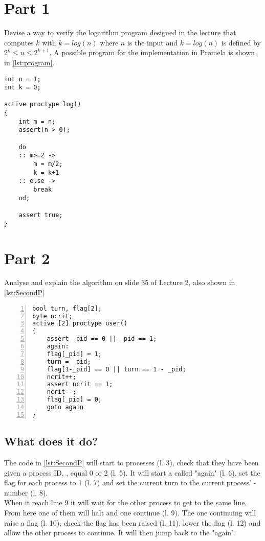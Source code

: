 \documentclass[Main]{subfiles}
\begin{document}
\section*{Part 1}

Devise a way to verify the logarithm program designed in the lecture that computes $k$ with $k = log(n)$ where $n$ is the input and $k = log(n)$ is defined by $2^k \leq n \leq 2^{k+1}$. 
A possible program for the implementation in Promela is shown in \codeTitle \ref{lst:program}.


\begin{lstlisting}[caption=Program in Prolog, style=Code-Matlab, label=lst:program]
int n = 1; 
int k = 0; 

active proctype log() 
{ 
	int m = n; 
	assert(n > 0);

	do
	:: m>=2 -> 
		m = m/2; 
		k = k+1
	:: else -> 
		break
	od;
	
	assert true;
}
\end{lstlisting}


\section*{Part 2}
Analyse and explain the algorithm on slide 35 of Lecture 2, also shown in \codeTitle \ref{lst:SecondP}


\begin{lstlisting}[caption=Program to explain, style=Code-Prolog, numbers = left, label=lst:SecondP]
bool turn, flag[2]; 
byte ncrit; 
active [2] proctype user()  
{ 
	assert _pid == 0 || _pid == 1; 
	again:
	flag[_pid] = 1;
	turn = _pid;
	flag[1-_pid] == 0 || turn == 1 - _pid; 
	ncrit++;
	assert ncrit == 1;
	ncrit--;
	flag[_pid] = 0; 
	goto again 
} 
\end{lstlisting}


\subsection{What does it do?}
The code in \codeTitle \ref{lst:SecondP} will start to processes (l. 3), check that they have been given a process ID, , equal 0 or 2 (l. 5).
It will start a  called "again" (l. 6), set the flag for each process to 1 (l. 7) and set the current turn to the current process' -number (l. 8).
\\
When it reach line 9 it will wait for the other process to get to the same line.
From here one of them will halt and one continue (l. 9).
The one continuing will raise a flag (l. 10), check the flag has been raised (l. 11), lower the flag (l. 12) and allow the other process to continue.
It will then jump back to the  "again".
\end{document}
